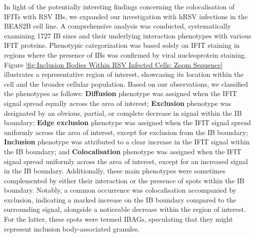 In light of the potentially intersting findings concerning the colocalisation of IFITs with RSV IBs, we expanded our investigation with hRSV infections in the BEAS2B cell line. A comprehensive analysis was conducted, systematically examining 1727 IB sizes and their underlying interaction phenotypes with various IFIT proteins. Phenotypic categorization was based solely on IFIT staining in regions where the presence of IBs was confirmed by viral nucleoprotein staining. Figure \ref{fig:Inclusion Bodies Within RSV Infected Cells: Zoom Sequence} illustrates a representative region of interest, showcasing its location within the cell and the broader cellular population. Based on our observations, we classified the phenotypes as follows: \textbf{Diffusion} phenotype was assigned when the IFIT signal spread equally across the area of interest; \textbf{Exclusion} phenotype was designated by an obvious, partial, or complete decrease in signal within the IB boundary; \textbf{Edge exclusion} phenotype was assigned when the IFIT signal spread uniformly across the area of interest, except for exclusion from the IB boundary; \textbf{Inclusion} phenotype was attributed to a clear increase in the IFIT signal within the IB boundary; and \textbf{Colocalisation} phenotype was assigned when the IFIT signal spread uniformly across the area of interest, except for an increased signal in the IB boundary. Additionally, these main phenotypes were sometimes complemented by either their interaction or the presence of spots within the IB boundary. Notably, a common occurrence was colocalisation accompanied by exclusion, indicating a marked increase on the IB boundary compared to the surrounding signal, alongside a noticeable decrease within the region of interest. For the latter, these spots were termed IBAGs, speculating that they might represent inclusion body-associated granules.

